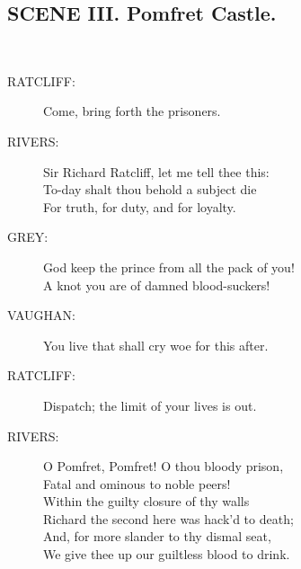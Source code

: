 \documentclass{article}
\begin{document}
\subsection*{SCENE III.  Pomfret Castle.}
\\
\begin{description}
\item[RATCLIFF:] 
\hspace{1pt}Come, bring forth the prisoners.\\
\end{description}
\begin{description}
\item[RIVERS:] 
\hspace{1pt}Sir Richard Ratcliff, let me tell thee this:\\
\hspace{1pt}To-day shalt thou behold a subject die\\
\hspace{1pt}For truth, for duty, and for loyalty.\\
\end{description}
\begin{description}
\item[GREY:] 
\hspace{1pt}God keep the prince from all the pack of you!\\
\hspace{1pt}A knot you are of damned blood-suckers!\\
\end{description}
\begin{description}
\item[VAUGHAN:] 
\hspace{1pt}You live that shall cry woe for this after.\\
\end{description}
\begin{description}
\item[RATCLIFF:] 
\hspace{1pt}Dispatch; the limit of your lives is out.\\
\end{description}
\begin{description}
\item[RIVERS:] 
\hspace{1pt}O Pomfret, Pomfret! O thou bloody prison,\\
\hspace{1pt}Fatal and ominous to noble peers!\\
\hspace{1pt}Within the guilty closure of thy walls\\
\hspace{1pt}Richard the second here was hack'd to death;\\
\hspace{1pt}And, for more slander to thy dismal seat,\\
\hspace{1pt}We give thee up our guiltless blood to drink.\\
\end{description}
\end{document}
